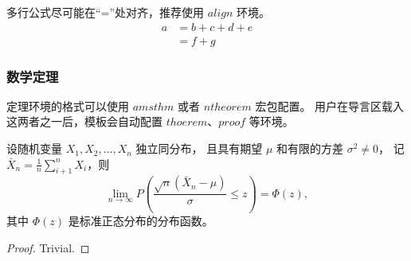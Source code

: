 多行公式尽可能在“=”处对齐，推荐使用 ${align}$ 环境。
\begin{align}
	a & = b + c + d + e \\
	& = f + g
\end{align}



\subsubsection{数学定理}

定理环境的格式可以使用 ${amsthm}$ 或者 ${ntheorem}$ 宏包配置。
用户在导言区载入这两者之一后，模板会自动配置 ${thoerem}$、${proof}$ 等环境。

\begin{theorem}
	设随机变量 $X_1,X_2, \dots, X_n$ 独立同分布， 且具有期望 $\mu$ 和有限的方差 $\sigma^2 \ne 0$，
	记 $\bar{X}_n = \frac{1}{n} \sum_{i+1}^n X_i$，则
	\begin{equation}
		\lim_{n \to \infty} P \left(\frac{\sqrt{n} \left( \bar{X}_n - \mu \right)}{\sigma} \le z \right) = \Phi(z),
	\end{equation}
	其中 $\Phi(z)$ 是标准正态分布的分布函数。
\end{theorem}
\begin{proof}
	Trivial.
\end{proof}
